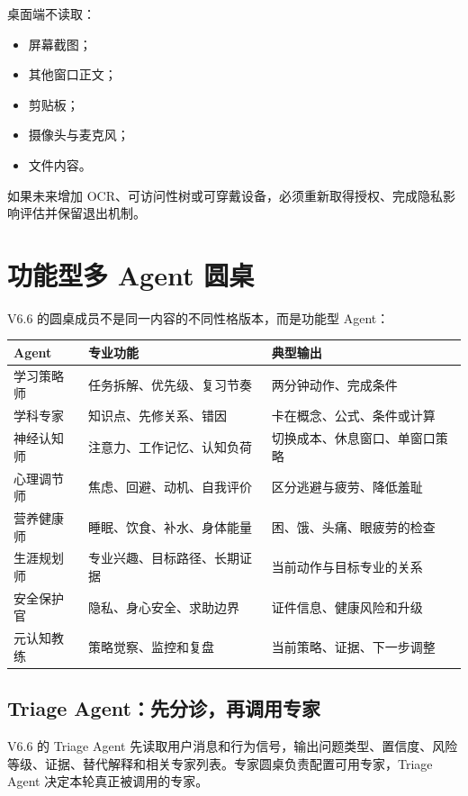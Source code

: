 \documentclass[UTF8,a4paper,11pt]{ctexart}
\begin{document}
桌面端不读取：

\begin{itemize}[leftmargin=2em]
\item 屏幕截图；
\item 其他窗口正文；
\item 剪贴板；
\item 摄像头与麦克风；
\item 文件内容。
\end{itemize}

如果未来增加 OCR、可访问性树或可穿戴设备，必须重新取得授权、完成隐私影响评估并保留退出机制。

\section{功能型多 Agent 圆桌}

V6.6 的圆桌成员不是同一内容的不同性格版本，而是功能型 Agent：

\begin{longtable}{@{}p{3.6cm}p{5.0cm}p{4.0cm}@{}}
\toprule
Agent & 专业功能 & 典型输出 \\
\midrule
学习策略师 & 任务拆解、优先级、复习节奏 & 两分钟动作、完成条件 \\
学科专家 & 知识点、先修关系、错因 & 卡在概念、公式、条件或计算 \\
神经认知师 & 注意力、工作记忆、认知负荷 & 切换成本、休息窗口、单窗口策略 \\
心理调节师 & 焦虑、回避、动机、自我评价 & 区分逃避与疲劳、降低羞耻 \\
营养健康师 & 睡眠、饮食、补水、身体能量 & 困、饿、头痛、眼疲劳的检查 \\
生涯规划师 & 专业兴趣、目标路径、长期证据 & 当前动作与目标专业的关系 \\
安全保护官 & 隐私、身心安全、求助边界 & 证件信息、健康风险和升级 \\
元认知教练 & 策略觉察、监控和复盘 & 当前策略、证据、下一步调整 \\
\bottomrule
\end{longtable}

\subsection{Triage Agent：先分诊，再调用专家}

V6.6 的 Triage Agent 先读取用户消息和行为信号，输出问题类型、置信度、风险等级、证据、替代解释和相关专家列表。专家圆桌负责配置可用专家，Triage Agent 决定本轮真正被调用的专家。
\end{document}
